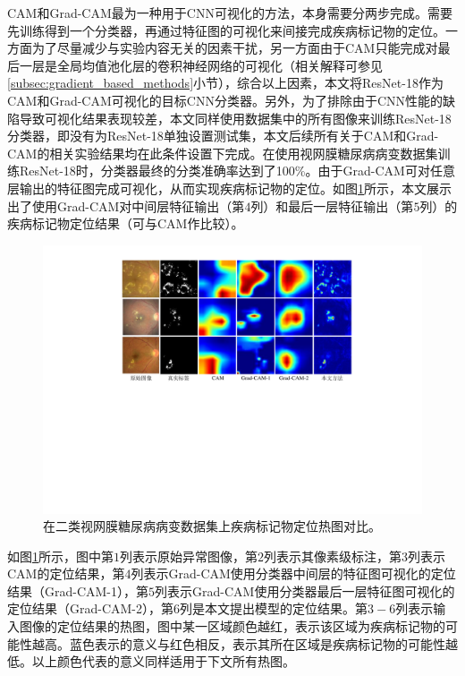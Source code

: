 CAM和Grad-CAM最为一种用于CNN可视化的方法，本身需要分两步完成。需要先训练得到一个分类器，再通过特征图的可视化来间接完成疾病标记物的定位。一方面为了尽量减少与实验内容无关的因素干扰，另一方面由于CAM只能完成对最后一层是全局均值池化层的卷积神经网络的可视化（相关解释可参见\ref{subsec:gradient_based_methods}小节），综合以上因素，本文将ResNet-18作为CAM和Grad-CAM可视化的目标CNN分类器。另外，为了排除由于CNN性能的缺陷导致可视化结果表现较差，本文同样使用数据集中的所有图像来训练ResNet-18分类器，即没有为ResNet-18单独设置测试集，本文后续所有关于CAM和Grad-CAM的相关实验结果均在此条件设置下完成。在使用视网膜糖尿病病变数据集训练ResNet-18时，分类器最终的分类准确率达到了100\%。由于Grad-CAM可对任意层输出的特征图完成可视化，从而实现疾病标记物的定位。如图\ref{fig:retinal_image_res}所示，本文展示出了使用Grad-CAM对中间层特征输出（第$4$列）和最后一层特征输出（第$5$列）的疾病标记物定位结果（可与CAM作比较）。
\begin{figure}[h]
	\centering
	\includegraphics[width=1.0\textwidth]{figure/retinal_image_res.pdf}
	\caption[在二类视网膜糖尿病病变数据集上疾病标记物定位热图对比]{在二类视网膜糖尿病病变数据集上疾病标记物定位热图对比。}
	\label{fig:retinal_image_res}
\end{figure}

如图\ref{fig:retinal_image_res}所示，图中第$1$列表示原始异常图像，第$2$列表示其像素级标注，第$3$列表示CAM的定位结果，第$4$列表示Grad-CAM使用分类器中间层的特征图可视化的定位结果（Grad-CAM-1），第$5$列表示Grad-CAM使用分类器最后一层特征图可视化的定位结果（Grad-CAM-2），第$6$列是本文提出模型的定位结果。第$3-6$列表示输入图像的定位结果的热图，图中某一区域颜色越红，表示该区域为疾病标记物的可能性越高。蓝色表示的意义与红色相反，表示其所在区域是疾病标记物的可能性越低。以上颜色代表的意义同样适用于下文所有热图。

